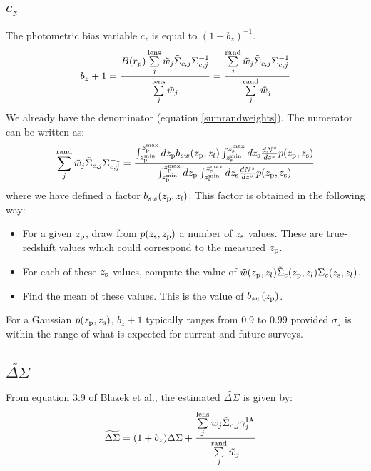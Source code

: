 \documentclass[onecolumn,amsmath,aps,fleqn, superscriptaddress]{revtex4}
\begin{document}
\subsection{$c_z$}

The photometric bias variable $c_z$ is equal to $(1+b_z)^{-1}$.
\begin{equation}
b_z+1 = \frac{B(r_p) \sum\limits^{\rm lens}_{j} \tilde{w}_j \tilde{\Sigma}_{c,j} \Sigma_{c,j}^{-1}}{\sum\limits^{\rm lens}_{j} \tilde{w}_j} = \frac{\sum\limits^{\rm rand}_{j} \tilde{w}_j \tilde{\Sigma}_{c,j} \Sigma_{c,j}^{-1}}{\sum\limits^{\rm rand}_{j} \tilde{w}_j}
\label{photozbias}
\end{equation}
We already have the denominator (equation \ref{sumrandweights}). The numerator can be written as:
\begin{equation}
\sum\limits^{\rm rand}_{j} \tilde{w}_j \tilde{\Sigma}_{c,j} \Sigma_{c,j}^{-1}  = \frac{\int_{z_{\rm p}^{\rm min}}^{z_{\rm p}^{\rm max}}dz_{\rm p} b_{sw}(z_{\rm p}, z_l) \int_{z_{\rm s}^{\rm min}}^{z_{\rm s}^{\rm max}}dz_{\rm s} \frac{dN^s}{dz^s} p(z_{\rm p}, z_{\rm s})}{\int_{z_{\rm p}^{\rm min}}^{z_{\rm p}^{\rm max}}dz_{\rm p}\int_{z_{\rm s}^{\rm min}}^{z_{\rm s}^{\rm max}}dz_{\rm s} \frac{dN^s}{dz^s} p(z_{\rm p}, z_{\rm s})}
\label{photoz}
\end{equation}
where we have defined a factor $b_{sw}(z_{\rm p}, z_l)$. This factor is obtained in the following way:
\begin{itemize}
\item{For a given $z_{\rm p}$, draw from $p(z_{\rm s}, z_{\rm p})$ a number of $z_{\rm s}$ values. These are true-redshift values which could correspond to the measured $z_{\rm p}$.}
\item{For each of these $z_{\rm s}$ values, compute the value of $\tilde{w}(z_{\rm p}, z_l) \tilde{\Sigma}_c(z_{\rm p}, z_l) \Sigma_c(z_{\rm s}, z_l)$.}
\item{Find the mean of these values. This is the value of $b_{sw}(z_{\rm p})$.}
\end{itemize}
For a Gaussian $p(z_{\rm p}, z_{\rm s})$, $b_z+1$ typically ranges from $0.9$ to $0.99$ provided $\sigma_z$ is within the range of what is expected for current and future surveys.

\subsection{$\widetilde{\Delta \Sigma}$}
From equation 3.9 of Blazek et al., the estimated $\widetilde{\Delta \Sigma}$ is given by:
\begin{align}
\widetilde{\Delta \Sigma}&= (1+b_z) \Delta \Sigma + \frac{\sum\limits_{j}^{\rm lens} \tilde{w}_j \tilde{\Sigma}_{c,j} \gamma^{\rm IA}_j }{\sum\limits_{j}^{\rm rand} \tilde{w}_j} 
\label{deltasigma}
\end{align}
\end{document}

